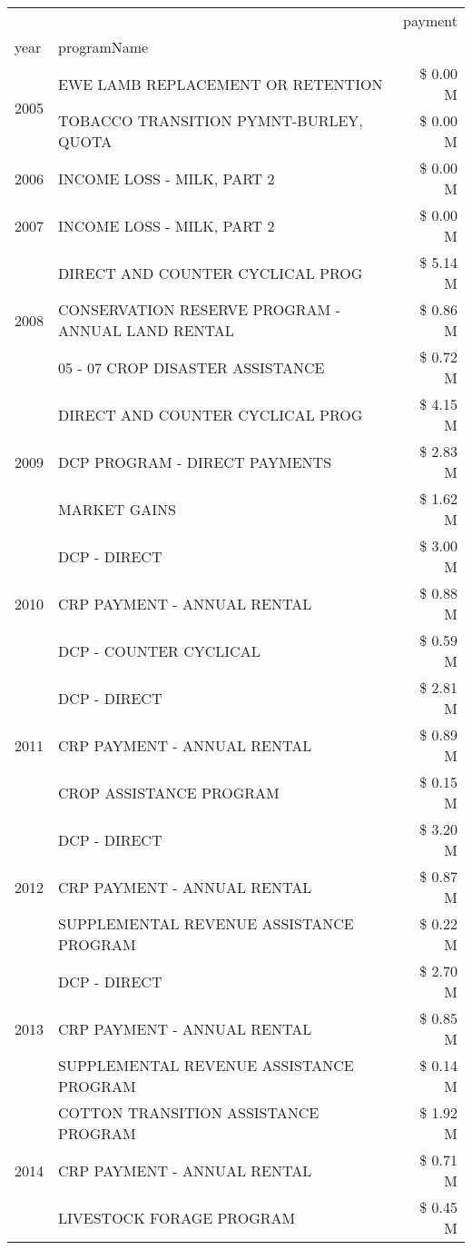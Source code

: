 \begin{tabular}{llr}
\toprule
 &  & payment \\
year & programName &  \\
\midrule
\multirow[t]{2}{*}{2005} & EWE LAMB REPLACEMENT OR RETENTION & \$ 0.00 M \\
 & TOBACCO TRANSITION PYMNT-BURLEY, QUOTA & \$ 0.00 M \\
\cline{1-3}
2006 & INCOME LOSS - MILK, PART 2 & \$ 0.00 M \\
\cline{1-3}
2007 & INCOME LOSS - MILK, PART 2 & \$ 0.00 M \\
\cline{1-3}
\multirow[t]{3}{*}{2008} & DIRECT AND COUNTER CYCLICAL PROG & \$ 5.14 M \\
 & CONSERVATION RESERVE PROGRAM - ANNUAL LAND RENTAL & \$ 0.86 M \\
 & 05 - 07 CROP DISASTER ASSISTANCE & \$ 0.72 M \\
\cline{1-3}
\multirow[t]{3}{*}{2009} & DIRECT AND COUNTER CYCLICAL PROG & \$ 4.15 M \\
 & DCP PROGRAM - DIRECT PAYMENTS & \$ 2.83 M \\
 & MARKET GAINS & \$ 1.62 M \\
\cline{1-3}
\multirow[t]{3}{*}{2010} & DCP - DIRECT & \$ 3.00 M \\
 & CRP PAYMENT - ANNUAL RENTAL & \$ 0.88 M \\
 & DCP - COUNTER CYCLICAL & \$ 0.59 M \\
\cline{1-3}
\multirow[t]{3}{*}{2011} & DCP - DIRECT & \$ 2.81 M \\
 & CRP PAYMENT - ANNUAL RENTAL & \$ 0.89 M \\
 & CROP ASSISTANCE PROGRAM & \$ 0.15 M \\
\cline{1-3}
\multirow[t]{3}{*}{2012} & DCP - DIRECT & \$ 3.20 M \\
 & CRP PAYMENT - ANNUAL RENTAL & \$ 0.87 M \\
 & SUPPLEMENTAL REVENUE ASSISTANCE PROGRAM & \$ 0.22 M \\
\cline{1-3}
\multirow[t]{3}{*}{2013} & DCP - DIRECT & \$ 2.70 M \\
 & CRP PAYMENT - ANNUAL RENTAL & \$ 0.85 M \\
 & SUPPLEMENTAL REVENUE ASSISTANCE PROGRAM & \$ 0.14 M \\
\cline{1-3}
\multirow[t]{3}{*}{2014} & COTTON TRANSITION ASSISTANCE PROGRAM & \$ 1.92 M \\
 & CRP PAYMENT - ANNUAL RENTAL & \$ 0.71 M \\
 & LIVESTOCK FORAGE PROGRAM & \$ 0.45 M \\

\end{tabular}
